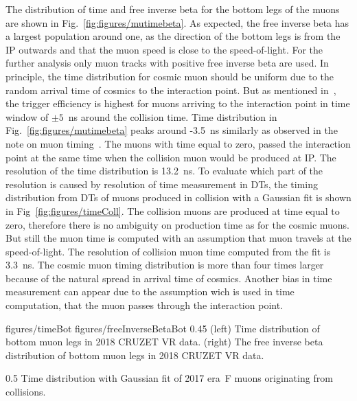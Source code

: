 The distribution of time and free inverse beta for the bottom legs of the muons are shown in Fig.~\ref{fig:figures/mutimebeta}. As expected, the free inverse beta has  a largest population around one, as the direction of the bottom legs is from the IP outwards and that the muon speed is close to the speed-of-light. For the further analysis only muon tracks with positive free inverse beta are used. In principle, the time distribution for cosmic muon should be uniform due to the random arrival time of cosmics to the interaction point. But as mentioned in~\cite{Chatrchyan:2009ig}, the trigger efficiency is highest for muons arriving to the interaction point in time window of $\pm 5$~ns around the collision time. Time distribution in Fig.~\ref{fig:figures/mutimebeta} peaks around -3.5~ns similarly as observed in the note on muon timing~\cite{Traczyk:1365029}. The muons with time equal to zero, passed the interaction point at the same time when the collision muon would be produced at IP. The resolution of the time distribution is 13.2~ns. To evaluate which part of the resolution is caused by resolution of time measurement in DTs, the timing distribution from DTs of muons produced in collision with a Gaussian fit is shown in Fig~\ref{fig:figures/timeColl}. The collision muons are produced at time equal to zero, therefore there is no ambiguity on production time as for the cosmic muons. But still the muon time is computed with an assumption that muon travels at the speed-of-light. The resolution of collision muon time computed from the fit is 3.3~ns. The cosmic muon timing distribution is more than four times larger because of the natural spread in arrival time of cosmics. Another bias in time measurement can appear due to the assumption wich is used in time computation, that the muon passes through the interaction point.
 

                 {figures/timeBot}
                 {figures/freeInverseBetaBot} %
                 {0.45}       %
                 {(left) Time distribution of bottom muon legs in 2018 CRUZET VR data. (right) The free inverse beta distribution of bottom muon legs in 2018 CRUZET VR data.}


                 {0.5}       %
                 { Time distribution with Gaussian fit of 2017 era~F muons originating from collisions.  }


